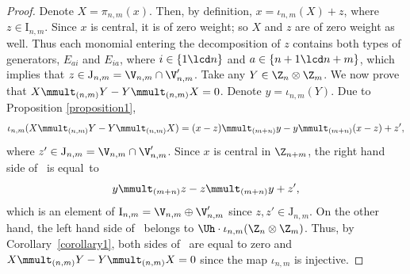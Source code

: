 \documentclass[pdftex]{sigma}
\numberwithin{equation}{section}
\begin{document}
\begin{proof}
Denote $X=\pi_{n,m}(x)$. Then, by def\/inition, $x=\iota_{n,m}(X)+z$, where $z\in\mathrm{I}_{n,m}$. Since $x$ is central, it is of zero weight;
so $X$ and $z$ are of zero weight as well. Thus each monomial entering the decomposition of $z$ contains both types of generators, $E_{ai}$ and
$E_{ia}$, where $i\in\{1\lcd n\}$ and $a\in\{ n+1\lcd n+m\}$, which implies that $z\in \mathrm{J}_{n,m}=\V_{n,m}\cap\V'_{n,m}$.
Take any $Y\in\Z_{n}\otimes\Z_m$. We now prove that $X\mmult_{(n,m)}Y-Y\mmult_{(n,m)}X=0$. Denote $y=\iota_{n,m}(Y)$.
Due to Proposition \ref{proposition1},
\begin{gather}\label{st5}
\iota_{n,m}(X\mmult_{(n,m)}Y-Y\mmult_{(n,m)}X)=(x-z)\mmult_{(m+n)}y-y\mmult_{(m+n)}(x-z)+z'  ,
\end{gather}
where $z'\in \mathrm{J}_{n,m}=\V_{n,m}\cap\V'_{n,m}$. Since $x$ is central in $\Z_{n+m}$, the right hand side of~
is equal~to
\[
y\mmult_{(m+n)}z-z\mmult_{(m+n)}y+z'  ,
\]
which is an element of $\mathrm{I}_{n,m}=\V_{n,m}\oplus \V'_{n,m}$ since $z,z'\in \mathrm{J}_{n,m}$. On the other hand, the left hand side of~
belongs to $\Uh\cdot\iota_{n,m}(\Z_n\otimes\Z_m)$. Thus, by Corollary~\ref{corollary1}, both sides of~ are equal to zero and
$X\mmult_{(n,m)}Y-Y\mmult_{(n,m)}X=0$ since the map $\iota_{n,m}$ is injective.
\end{proof}
\end{document}
